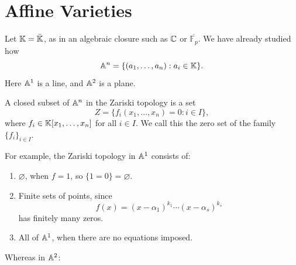 
\section{Affine Varieties}

Let $\kk = \bar{\kk}$, as in an algebraic closure such as $\c$ or $\overline{\mathbb{F}_p}$.
We have already studied how
\[
    \aa^n = \{(a_1,\ldots,a_n) : a_i\in\kk\}.
\]
Here $\aa^1$ is a line, and $\aa^2$ is a plane.

\begin{definition}
    A closed subset of $\aa^n$ in the Zariski topology is a set
    \[
        Z = \{f_i(x_1,\ldots,x_n) = 0 : i\in I\},
    \]
    where $f_i\in\kk[x_1,\ldots,x_n]$ for all $i\in I$.
    We call this the zero set of the family $\{f_i\}_{i\in I}$.
\end{definition}

For example, the Zariski topology in $\aa^1$ consists of:
\begin{enumerate}[label={(\arabic*)}]
    \item $\varnothing$, when $f = 1$, so $\{1 = 0\} = \varnothing$.
    \item Finite sets of points, since
    \[
        f(x) = (x-\alpha_1)^{k_1}\cdots(x-\alpha_s)^{k_s}
    \]
    has finitely many zeros.
    \item All of $\aa^1$, when there are no equations imposed.
\end{enumerate}

Whereas in $\aa^2$:

